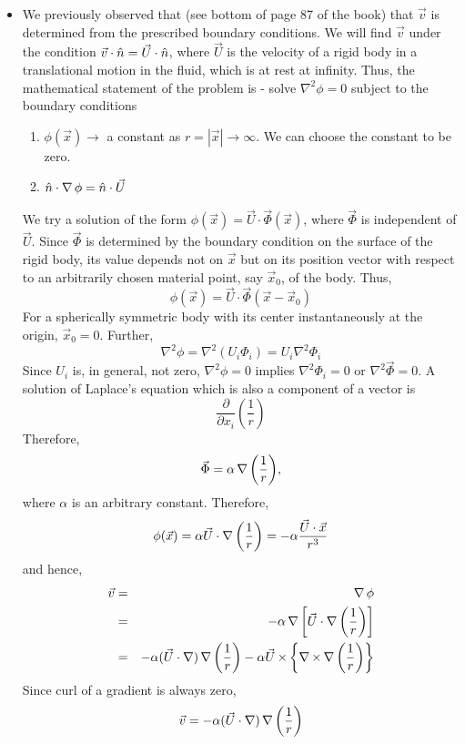 \begin{itemize}
\item We previously observed that (see bottom of page 87 of the book) that $\vec{v}$ is determined from the prescribed boundary conditions. We will find $\vec{v}$ under the condition
$\vec{v}\cdot\hat{n} = \vec{U}\cdot\hat{n}$, where $\vec{U}$ is the velocity of a rigid body in a translational motion in the fluid, which is at rest at infinity. Thus, the mathematical 
statement of the problem is - solve $\nabla^2\phi = 0$ subject to the boundary conditions
\begin{enumerate}
\item $\phi(\vec{x}) \rightarrow$ a constant as $r = |\vec{x}| \rightarrow \infty$. We can choose the constant to be zero.
\item $\hat{n}\cdot\operatorname{\nabla}{\phi} = \hat{n}\cdot\vec{U}$
\end{enumerate}
We try a solution of the form $\phi(\vec{x}) = \vec{U}\cdot\vec{\Phi}(\vec{x})$, where $\vec{\Phi}$ is independent of $\vec{U}$. Since $\vec{\Phi}$ is determined by the boundary
condition on the surface of the rigid body, its value depends not on $\vec{x}$ but on its position vector with respect to an arbitrarily chosen material point, say $\vec{x}_0$, of the 
body. Thus,
\[
\phi(\vec{x}) = \vec{U}\cdot\vec{\Phi}(\vec{x} - \vec{x}_0)
\]
For a spherically symmetric body with its center instantaneously at the origin, $\vec{x}_0 = 0$. Further,
\[
\nabla^2\phi = \nabla^2(U_i\Phi_i) = U_i\nabla^2\Phi_i
\]
Since $U_i$ is, in general, not zero, $\nabla^2\phi = 0$ implies $\nabla^2\Phi_i = 0$ or $\nabla^2\vec{\Phi} = 0$. A solution of Laplace's equation which is also a component of a vector
is
\[
\frac{\partial}{\partial x_i}\left(\frac{1}{r}\right)
\]
Therefore, 
\[
\vec{\Phi} = \alpha\operatorname{\nabla}{\left(\frac{1}{r}\right)},
\]
where $\alpha$ is an arbitrary constant. Therefore,
\[
\phi(\vec{x}) = \alpha\vec{U}\cdot\operatorname{\nabla}{\left(\frac{1}{r}\right)} = -\alpha\frac{\vec{U}\cdot\vec{x}}{r^3}
\]
and hence,
\begin{eqnarray*}
\vec{v} &=& \operatorname{\nabla}{\phi} \\
 &=& -\alpha\operatorname{\nabla}{\left[\vec{U}\cdot\operatorname{\nabla}{\left(\frac{1}{r}\right)}\right]} \\
 &=& -\alpha(\vec{U}\cdot\nabla)\operatorname{\nabla}{\left(\frac{1}{r}\right)} - \alpha\vec{U}\operatorname{\times}\left\{\operatorname{\nabla\operatorname{\times}}{\operatorname{\nabla}{\left(\frac{1}{r}\right)}}\right\}
\end{eqnarray*}
Since curl of a gradient is always zero,
\[
\vec{v} = -\alpha(\vec{U}\cdot\nabla)\operatorname{\nabla}{\left(\frac{1}{r}\right)}
\]
\end{itemize}

